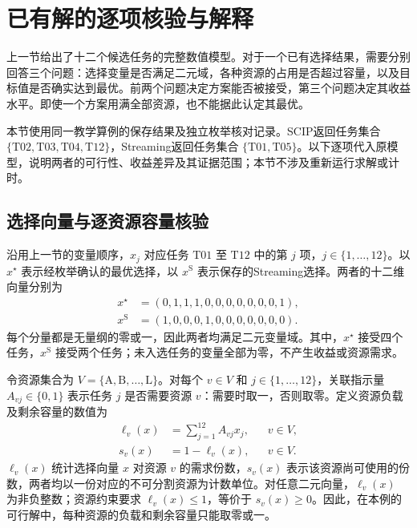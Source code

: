 \section{已有解的逐项核验与解释}
\label{sec:02_07}

上一节给出了十二个候选任务的完整数值模型。对于一个已有选择结果，需要分别回答三个问题：选择变量是否满足二元域，各种资源的占用是否超过容量，以及目标值是否确实达到最优。前两个问题决定方案能否被接受，第三个问题决定其收益水平。即使一个方案用满全部资源，也不能据此认定其最优。

本节使用同一教学算例的保存结果及独立枚举核对记录。SCIP返回任务集合 $\{\mathrm{T02},\allowbreak\mathrm{T03},\allowbreak\mathrm{T04},\allowbreak\mathrm{T12}\}$，Streaming返回任务集合 $\{\mathrm{T01},\allowbreak\mathrm{T05}\}$。以下逐项代入原模型，说明两者的可行性、收益差异及其证据范围；本节不涉及重新运行求解或计时。

\subsection{选择向量与逐资源容量核验}

沿用上一节的变量顺序，$x_j$ 对应任务 $\mathrm{T01}$ 至 $\mathrm{T12}$ 中的第 $j$ 项，$j\in\{1,\ldots,12\}$。以 $x^{\star}$ 表示经枚举确认的最优选择，以 $x^{\mathrm{S}}$ 表示保存的Streaming选择。两者的十二维向量分别为
\begin{align}
 x^{\star}&=(0,1,1,1,0,0,0,0,0,0,0,1),
 \label{s0207:optimal_vector}\\
 x^{\mathrm{S}}&=(1,0,0,0,1,0,0,0,0,0,0,0).
 \label{s0207:streaming_vector}
\end{align}
每个分量都是无量纲的零或一，因此两者均满足二元变量域。其中，$x^{\star}$ 接受四个任务，$x^{\mathrm{S}}$ 接受两个任务；未入选任务的变量全部为零，不产生收益或资源需求。

令资源集合为 $V=\{\mathrm{A},\mathrm{B},\ldots,\mathrm{L}\}$。对每个 $v\in V$ 和 $j\in\{1,\ldots,12\}$，关联指示量 $A_{vj}\in\{0,1\}$ 表示任务 $j$ 是否需要资源 $v$：需要时取一，否则取零。定义资源负载及剩余容量的数值为
\begin{align}
 \ell_v(x)&=\sum_{j=1}^{12}A_{vj}x_j,
 &&v\in V,
 \label{s0207:resource_load}\\
 s_v(x)&=1-\ell_v(x),
 &&v\in V.
 \label{s0207:resource_slack}
\end{align}
$\ell_v(x)$ 统计选择向量 $x$ 对资源 $v$ 的需求份数，$s_v(x)$ 表示该资源尚可使用的份数，两者均以一份对应的不可分割资源为计数单位。对任意二元向量，$\ell_v(x)$ 为非负整数；资源约束要求 $\ell_v(x)\leq1$，等价于 $s_v(x)\geq0$。因此，在本例的可行解中，每种资源的负载和剩余容量只能取零或一。

